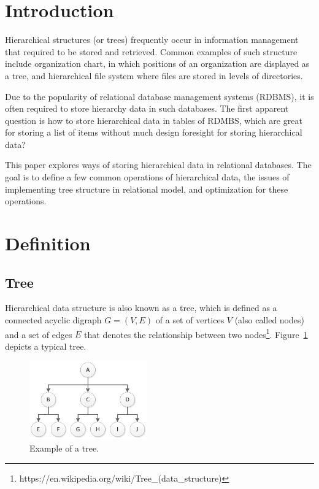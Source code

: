 \section{Introduction}\label{section-introduction}


Hierarchical structures (or trees) frequently occur in information management that required to be stored and retrieved. Common examples of such structure include organization chart, in which positions of an organization are displayed as a tree, and hierarchical file system where files are stored in levels of directories.

Due to the popularity of relational database management systems (RDBMS), it is often required to store hierarchy data in such databases. The first apparent question is how to store hierarchical data in tables of RDMBS, which are great for storing a list of items without much design foresight for storing hierarchical data?

This paper explores ways of storing hierarchical data in relational databases. The goal is to define a few common operations of hierarchical data, the issues of implementing tree structure in relational model, and optimization for these operations.

\section{Definition}\label{section-definition}

\subsection{Tree}\label{section-tree}

Hierarchical data structure is also known as a tree, which is defined as a connected acyclic digraph $G=(V,E)$ of a set of vertices $V$ (also called nodes) and a set of edges $E$ that denotes the relationship between two nodes\footnote{https://en.wikipedia.org/wiki/Tree\_(data\_structure)}. Figure~\ref{fig:tree} depicts a typical tree.

\begin{figure}[!h]
\begin{center}
\includegraphics[width=2in]{images/tree.eps}
\caption{Example of a tree.\label{fig:tree}}
\end{center}
\end{figure}

